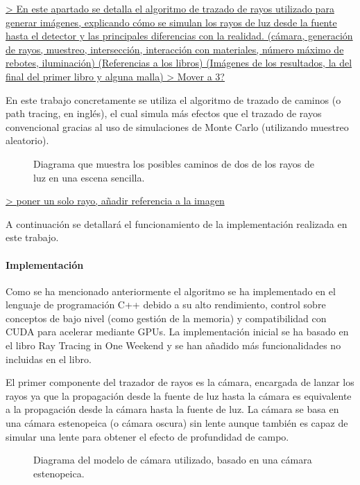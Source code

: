 \documentclass[10pt, a4paper]{article}
\begin{document}
\underline{> En este apartado se detalla el algoritmo de trazado de rayos utilizado para generar imágenes, explicando cómo se simulan los rayos de luz desde la fuente hasta el detector y las principales diferencias con la realidad. (cámara, generación de rayos, muestreo, intersección, interacción con materiales, número máximo de rebotes, iluminación) (Referencias a los libros) (Imágenes de los resultados, la del final del primer libro y alguna malla)
> Mover a 3?}

En este trabajo concretamente se utiliza el algoritmo de trazado de caminos (o path tracing, en inglés), el cual simula más efectos que el trazado de rayos convencional gracias al uso de simulaciones de Monte Carlo (utilizando muestreo aleatorio).

\begin{figure}[H]
    \centering 
    

    \caption{Diagrama que muestra los posibles caminos de dos de los rayos de luz en una escena sencilla.}
    \label{fig:rebotes}
\end{figure}

\underline{> poner un solo rayo, añadir referencia a la imagen}

A continuación se detallará el funcionamiento de la implementación realizada en este trabajo.

\paragraph{Implementación}

Como se ha mencionado anteriormente el algoritmo se ha implementado en el lenguaje de programación C++ debido a su alto rendimiento, control sobre conceptos de bajo nivel (como gestión de la memoria) y compatibilidad con CUDA para acelerar mediante GPUs. La implementación inicial se ha basado en el libro Ray Tracing in One Weekend \cite{Shirley:2024} y se han añadido más funcionalidades no incluidas en el libro.

El primer componente del trazador de rayos es la cámara, encargada de lanzar los rayos ya que la propagación desde la fuente de luz hasta la cámara es equivalente a la propagación desde la cámara hasta la fuente de luz. La cámara se basa en una cámara estenopeica (o cámara oscura) sin lente aunque también es capaz de simular una lente para obtener el efecto de profundidad de campo.

\begin{figure}[H]
    \centering 
    
    \caption{Diagrama del modelo de cámara utilizado, basado en una cámara estenopeica.}
    \label{fig:diagrama-camara}
\end{figure}
\end{document}
